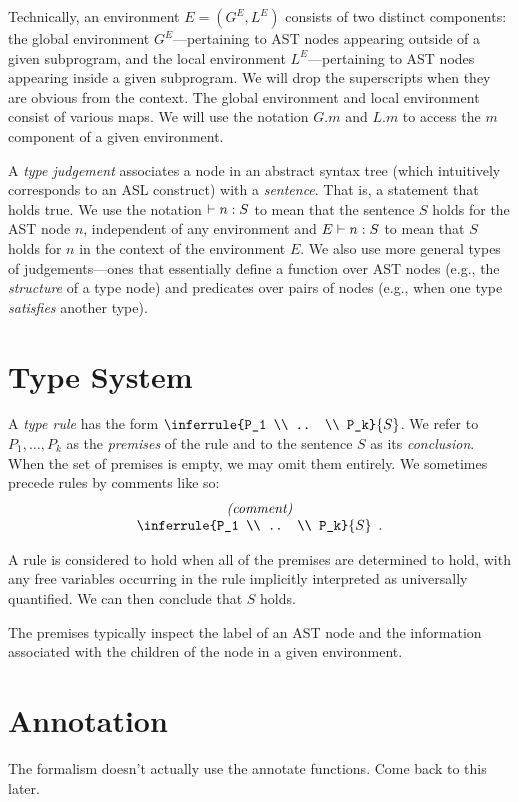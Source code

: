 \documentclass{book}
\newcommand\RuleComment[1]{\textit{(#1)}}
\begin{document}
Technically, an environment $E=(G^E, L^E)$ consists of two
distinct components: the global environment $G^E$---pertaining to AST nodes
appearing outside of a given subprogram, and the local environment
$L^E$---pertaining to AST nodes appearing inside a given subprogram.
%
We will drop the superscripts when they are obvious from the context.
%
The global environment and local environment consist of various maps. We will use the notation $G.m$ and $L.m$ to access the $m$ component of a given environment.


A \emph{type judgement} associates a node in an abstract syntax tree (which
intuitively corresponds to an ASL construct) with a \emph{sentence}. That is, a statement that holds true.
%
We use the notation $\vdash n : S$ to mean that the sentence $S$ holds for the AST node $n$, independent of any environment and $E \vdash n : S$ to mean that $S$ holds for $n$ in the context of the environment $E$.
%
We also use more general types of judgements---ones that essentially define a function over AST nodes (e.g., the \emph{structure} of a type node) and predicates over pairs of nodes (e.g., when one type \emph{satisfies} another type).

\section{Type System}
A \emph{type rule} has the form $\inferrule{P_1 \\ .. \\ P_k}{S}$. We refer to $P_1,\ldots,P_k$ as the \emph{premises} of the rule and to the sentence $S$ as its \emph{conclusion}. When the set of premises is empty, we may omit them entirely.
%
We sometimes precede rules by comments like so:
\[
\begin{array}{c}
\RuleComment{comment}\\
\inferrule{P_1 \\ .. \\ P_k}{S} \enspace.
\end{array} 
\]

A rule is considered to hold when all of the premises are determined to hold,
with any free variables occurring in the rule implicitly interpreted as
universally quantified. We can then conclude that $S$ holds.

The premises typically inspect the label of an AST node and the information
associated with the children of the node in a given environment.

\section{Annotation}
\begin{emptytodo}
The formalism doesn't actually use the annotate functions. Come back to this later.
\end{emptytodo}
\end{document}
